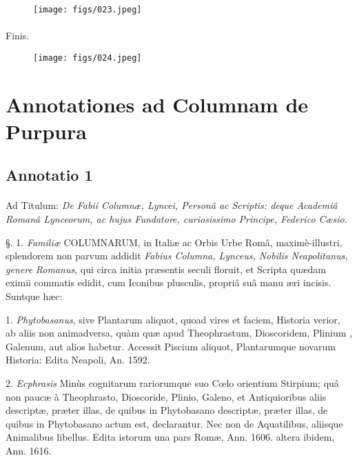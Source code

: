 \documentclass[a4paper, 11pt, oneside, polutonikogreek, german]{article}
\begin{document}
\begin{figure}[H]
\centering
\texttt{[image: figs/023.jpeg]}

\end{figure}
\paragraph{}
Finis.

\begin{figure}[H]
\centering
\texttt{[image: figs/024.jpeg]}

\end{figure}
\clearpage
\section{Annotationes ad Columnam de Purpura}

\subsection{Annotatio 1}
\paragraph{}
Ad Titulum: \emph{De Fabii Columnæ, Lyncei, Personâ ac Scriptis: deque Academiâ Romanâ Lynceorum, ac hujus Fundatore, curiosissimo Principe, Federico Cæsio}.

§. 1. \emph{Familiæ} COLUMNARUM, in Italiæ ac Orbis Urbe Româ, maximè-illustri, splendorem non parvum addidit \emph{Fabius Columna, Lynceus, Nobilis Neapolitanus, genere Romanus}, qui circa initia præsentis seculi floruit, et Scripta quædam eximii commatis edidit, cum Iconibus plusculis, propriâ suâ manu æri incisis. Suntque hæc:

1. \emph{Phytobasanus}, sive Plantarum aliquot, quoad vires et faciem, Historia verior, ab aliis non animadversa, quàm quæ apud Theophrastum, Dioscoridem, Plinium , Galenum, aut alios habetur. Accessit Piscium aliquot, Plantarumque novarum Historia: Edita Neapoli, An. 1592.

2. \emph{Ecphrasis} Minùs cognitarum rariorumque suo Cœlo orientium Stirpium; quâ non paucæ à Theophrasto, Dioscoride, Plinio, Galeno, et Antiquioribus aliis descriptæ, præter illas, de quibus in Phytobasano descriptæ, præter illas, de quibus in Phytobasano actum est, declarantur. Nec non de Aquatilibus, aliisque Animalibus libellus. Edita istorum una pars Romæ, Ann. 1606. altera ibidem, Ann. 1616.
\end{document}
